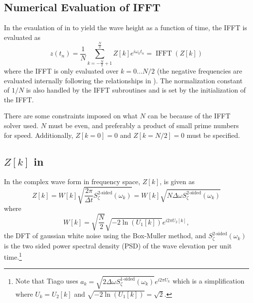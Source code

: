 \subsection{Numerical Evaluation of IFFT}
In the evaulation of  in \HD to yield the wave height as a function of time, the IFFT is evaluated as
\begin{equation}
   z(t_n) = \frac{1}{N} \sum\limits_{k=-\frac{N}{2}+1}^{\frac{N}{2}} Z[k] e^{i\omega_k t_n} = \operatorname{IFFT}\left(Z[k]\right) 
\label{eq:IFFTofZ:eval}
\end{equation}
where the IFFT is only evaluated over $k = 0 \ldots N/2$ (the negative frequencies are evaluated internally following the relationships in ).  The normalization constant of $1/N$ is also handled by the IFFT subroutines and is set by the initialization of the IFFT.

There are some constraints imposed on what $N$ can be because of the IFFT solver used.  $N$ must be even, and preferably a product of small prime numbers for speed.  Additionally, $Z[k=0] = 0$ and $Z[k=N/2] = 0$ must be specified.


\subsection{$Z[k]$ in \HD}
In \HD the complex wave form in frequency space, $Z[k]$, is given as
\begin{equation}
   Z[k] = W[k]\sqrt{\frac{2\pi}{\Delta t} S^\text{2-sided}_\zeta (\omega_k)} = W[k]\sqrt{N \Delta \omega S^\text{2-sided}_\zeta (\omega_k)}
\label{eq:Zk}
\end{equation}
where 
\begin{equation}
   W[k]  = \sqrt{\frac{N}{2}}\sqrt{-2 \ln \left( U_1[k]\right)}e^{i 2\pi U_2[k]},
\label{eq:Wk}
\end{equation}
the DFT of gaussian white noise using the Box-Muller method, and $S^\text{2-sided}_\zeta(\omega_k)$ is the two sided power spectral density (PSD) of the wave elevation per unit time.\footnote{Note that Tiago uses $a_k = \sqrt{2\Delta \omega S^\text{1-sided}_\zeta(\omega_k)}e^{i 2\pi U_k}$ which is a simplification where $U_k = U_2[k]$ and $\sqrt{-2 \ln\left(U_1[k]\right)} = \sqrt{2}$.}




